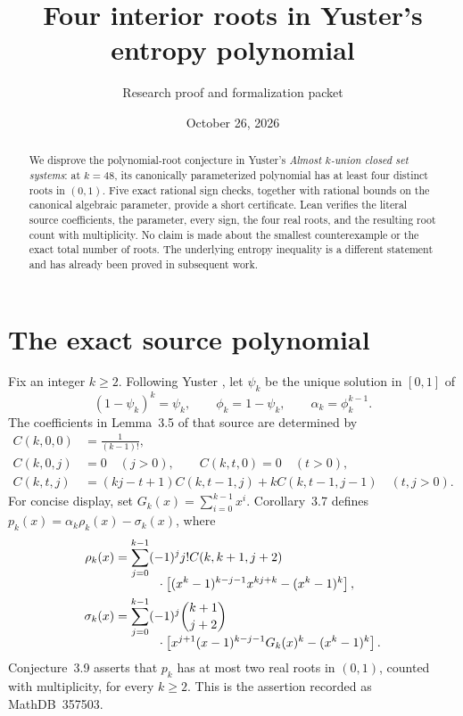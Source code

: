 \documentclass[11pt]{article}
\title{Four interior roots in Yuster's entropy polynomial}
\author{Research proof and formalization packet}
\date{October 26, 2026}
\begin{document}
\maketitle
\begin{abstract}
We disprove the polynomial-root conjecture in Yuster's \emph{Almost
$k$-union closed set systems}: at $k=48$, its canonically parameterized
polynomial has at least four distinct roots in $(0,1)$. Five exact
rational sign checks, together with rational bounds on the canonical
algebraic parameter, provide a short certificate. Lean verifies the
literal source coefficients, the parameter, every sign, the four real
roots, and the resulting root count with multiplicity. No claim is made
about the smallest counterexample or the exact total number of roots.
The underlying entropy inequality is a different statement and has
already been proved in subsequent work.
\end{abstract}

\section{The exact source polynomial}
Fix an integer $k\geq2$. Following Yuster \cite[Section~3]{Yuster}, let
$\psi_k$ be the unique solution in $[0,1]$ of
\[
 (1-\psi_k)^k=\psi_k,
 \qquad \phi_k=1-\psi_k,\qquad \alpha_k=\phi_k^{k-1}.
\]
The coefficients in Lemma~3.5 of that source are determined by
\begin{align*}
 C(k,0,0)&=\frac1{(k-1)!},\\
 C(k,0,j)&=0\quad(j>0),\qquad C(k,t,0)=0\quad(t>0),\\
 C(k,t,j)&=(kj-t+1)C(k,t-1,j)+kC(k,t-1,j-1)
       \quad(t,j>0).
\end{align*}
For concise display, set $G_k(x)=\sum_{i=0}^{k-1}x^i$. Corollary~3.7
defines $p_k(x)=\alpha_k\rho_k(x)-\sigma_k(x)$, where
\begin{align}
 \rho_k(x)&=\sum_{j=0}^{k-1}(-1)^j j! C(k,k+1,j+2)\notag\\[-2mm]
 &\hspace{12mm}\cdot\left[(x^k-1)^{k-j-1}x^{kj+k}-(x^k-1)^k\right],\label{eq:rho}\\
 \sigma_k(x)&=\sum_{j=0}^{k-1}(-1)^j\binom{k+1}{j+2}\notag\\[-2mm]
 &\hspace{12mm}\cdot\left[x^{j+1}(x-1)^{k-j-1}G_k(x)^k-(x^k-1)^k\right].\label{eq:sigma}
\end{align}
Conjecture~3.9 asserts that $p_k$ has at most two real roots in $(0,1)$,
counted with multiplicity, for every $k\geq2$. This is the assertion
recorded as MathDB~357503.
\end{document}
